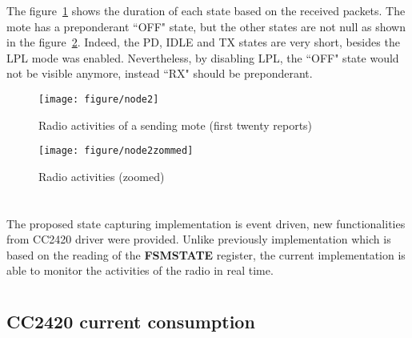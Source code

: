 \documentclass[a4paper,11pt]{article}
\begin{document}
The figure~\ref{fig:histogram} shows the duration of each state based on the received packets. The mote has a preponderant ``OFF" state, but the other states are not null as shown in the figure~\ref{fig:histogram2}.
Indeed, the PD, IDLE and TX states are very short, besides the LPL mode was enabled. Nevertheless, by disabling LPL, the ``OFF" state would not be visible anymore, instead ``RX" should be preponderant.

  \begin{figure}[ht]
    \centering
    \texttt{[image: figure/node2]}
    \caption{Radio activities of a sending mote (first twenty reports)}
    \label{fig:histogram}
  \end{figure}

  \begin{figure}[ht]
    \centering
    \texttt{[image: figure/node2zommed]}
    \caption{Radio activities (zoomed)}
    \label{fig:histogram2}
  \end{figure}

\section{}

The proposed state capturing implementation is event driven, new functionalities from CC2420 driver were provided. Unlike previously implementation which is based on the reading of the \textbf{FSMSTATE} register, the current implementation is able to monitor the activities of the radio in real time.

\newpage

\section*{}

  \subsection*{CC2420 current consumption}
\end{document}
